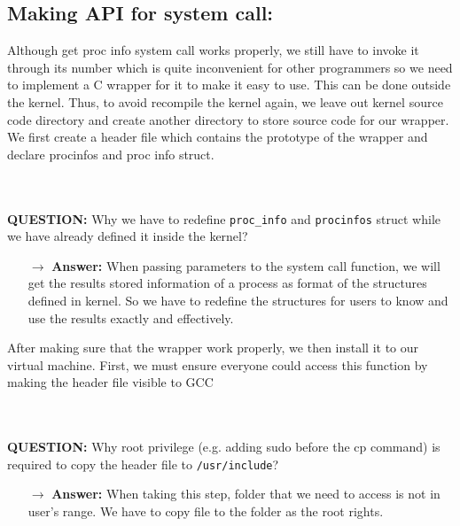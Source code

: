 \documentclass[a4paper]{article}
\begin{document}
\subsection{Making API for system call:}
Although get proc info system call works properly, we still have to invoke it through its number which is quite inconvenient for other programmers so we need to implement a C wrapper for it to make it easy to use. This can be done outside the kernel. Thus, to avoid recompile the kernel again, we leave out kernel source code directory and create another directory to store source code for our wrapper. We first create a header file which contains the prototype of the wrapper and declare procinfos and proc info struct. \\
\noindent{}\\
\\
\begin{mdframed}[hidealllines=true,backgroundcolor=blue!10]
\textbf{QUESTION:}  Why we have to redefine \texttt{proc\_info} and \texttt{procinfos} struct while we have already defined it inside the kernel? 
\begin{itemize}
\item[$\rightarrow$] \textbf{Answer:}
When passing parameters to the system call function, we will get the results stored information of a process as format of the structures defined in kernel. So we have to redefine the structures for users to know and use the results exactly and effectively. \\
\end{itemize}
\end{mdframed}
After making sure that the wrapper work properly, we then install it to our virtual machine. First, we must ensure everyone could access this function by making the header file visible to GCC\\
\noindent{}\\
\\
\begin{mdframed}[hidealllines=true,backgroundcolor=blue!10]
\textbf{QUESTION:}   Why root privilege (e.g. adding sudo before the cp command) is required to copy the header file to \texttt{/usr/include}? 
\begin{itemize}
\item[$\rightarrow$] \textbf{Answer:}
When taking this step, folder that we need to access is not in user’s range. We have to copy file to the folder as the root rights.\\
\end{itemize}
\end{mdframed}
\end{document}
